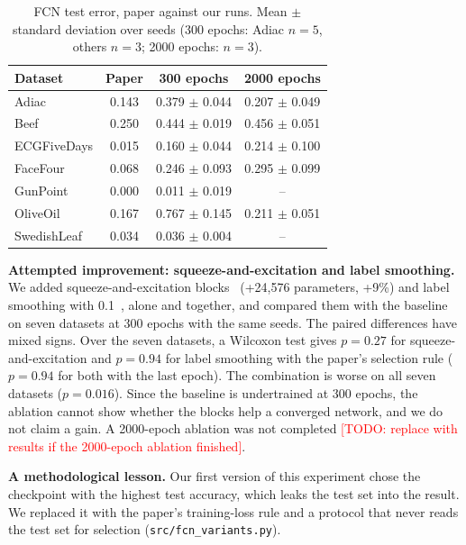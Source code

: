 \documentclass[conference]{IEEEtran}
\newcommand{\todo}[1]{\textcolor{red}{[TODO: #1]}}
\begin{document}
\begin{table}[htbp]
\caption{FCN test error, paper against our runs. Mean $\pm$ standard deviation over seeds (300 epochs: Adiac $n=5$, others $n=3$; 2000 epochs: $n=3$).}
\begin{center}
\footnotesize
\setlength{\tabcolsep}{3pt}
\begin{tabular}{|l|c|c|c|}
\hline
\textbf{Dataset} & \textbf{Paper} & \textbf{300 epochs} & \textbf{2000 epochs} \\
\hline
Adiac & 0.143 & 0.379 $\pm$ 0.044 & 0.207 $\pm$ 0.049 \\
Beef & 0.250 & 0.444 $\pm$ 0.019 & 0.456 $\pm$ 0.051 \\
ECGFiveDays & 0.015 & 0.160 $\pm$ 0.044 & 0.214 $\pm$ 0.100 \\
FaceFour & 0.068 & 0.246 $\pm$ 0.093 & 0.295 $\pm$ 0.099 \\
GunPoint & 0.000 & 0.011 $\pm$ 0.019 & -- \\
OliveOil & 0.167 & 0.767 $\pm$ 0.145 & 0.211 $\pm$ 0.051 \\
SwedishLeaf & 0.034 & 0.036 $\pm$ 0.004 & -- \\
\hline
\end{tabular}
\label{tab:fcn}
\end{center}
\end{table}

\textbf{Attempted improvement: squeeze-and-excitation and label smoothing.} We added squeeze-and-excitation blocks~\cite{hu2018} (+24,576 parameters, +9\%) and label smoothing with 0.1~\cite{szegedy2016}, alone and together, and compared them with the baseline on seven datasets at 300 epochs with the same seeds. The paired differences have mixed signs. Over the seven datasets, a Wilcoxon test gives $p=0.27$ for squeeze-and-excitation and $p=0.94$ for label smoothing with the paper's selection rule ($p=0.94$ for both with the last epoch). The combination is worse on all seven datasets ($p=0.016$). Since the baseline is undertrained at 300 epochs, the ablation cannot show whether the blocks help a converged network, and we do not claim a gain. A 2000-epoch ablation was not completed \todo{replace with results if the 2000-epoch ablation finished}.

\textbf{A methodological lesson.} Our first version of this experiment chose the checkpoint with the highest test accuracy, which leaks the test set into the result. We replaced it with the paper's training-loss rule and a protocol that never reads the test set for selection (\texttt{src/fcn\_variants.py}).
\end{document}
